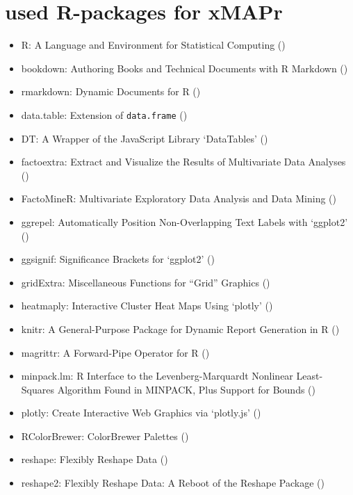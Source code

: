 \documentclass[
]{book}
\providecommand{\tightlist}{%
  \setlength{\itemsep}{0pt}\setlength{\parskip}{0pt}}
\begin{document}
\chapter{used R-packages for xMAPr}\label{used-r-packages-for-xmapr}

\begin{itemize}
\tightlist
\item
  R: A Language and Environment for Statistical Computing (\citet{R-base})
\item
  bookdown: Authoring Books and Technical Documents with R Markdown (\citet{R-bookdown})
\item
  rmarkdown: Dynamic Documents for R (\citet{R-rmarkdown})
\item
  data.table: Extension of \texttt{data.frame} (\citet{R-data.table})
\item
  DT: A Wrapper of the JavaScript Library `DataTables' (\citet{R-DT})
\item
  factoextra: Extract and Visualize the Results of Multivariate Data Analyses (\citet{R-factoextra})
\item
  FactoMineR: Multivariate Exploratory Data Analysis and Data Mining (\citet{R-FactoMineR})
\item
  ggrepel: Automatically Position Non-Overlapping Text Labels with `ggplot2' (\citet{R-ggrepel})
\item
  ggsignif: Significance Brackets for `ggplot2' (\citet{R-ggsignif})
\item
  gridExtra: Miscellaneous Functions for ``Grid'' Graphics (\citet{R-gridExtra})
\item
  heatmaply: Interactive Cluster Heat Maps Using `plotly' (\citet{R-heatmaply})
\item
  knitr: A General-Purpose Package for Dynamic Report Generation in R (\citet{R-knitr})
\item
  magrittr: A Forward-Pipe Operator for R (\citet{R-magrittr})
\item
  minpack.lm: R Interface to the Levenberg-Marquardt Nonlinear Least-Squares Algorithm Found in MINPACK, Plus Support for Bounds (\citet{R-minpack.lm})
\item
  plotly: Create Interactive Web Graphics via `plotly.js' (\citet{R-plotly})
\item
  RColorBrewer: ColorBrewer Palettes (\citet{R-RColorBrewer})
\item
  reshape: Flexibly Reshape Data (\citet{R-reshape})
\item
  reshape2: Flexibly Reshape Data: A Reboot of the Reshape Package (\citet{R-reshape2})

\end{itemize}
\end{document}
